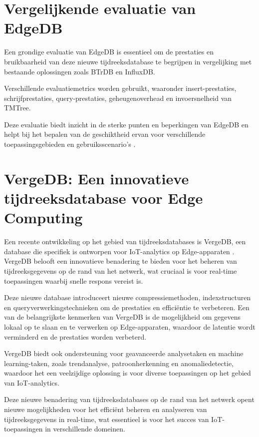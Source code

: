\section{Vergelijkende evaluatie van EdgeDB}

Een grondige evaluatie van EdgeDB is essentieel om de prestaties en bruikbaarheid van deze nieuwe tijdreeksdatabase te begrijpen in vergelijking met bestaande oplossingen zoals BTrDB en InfluxDB.

Verschillende evaluatiemetrics worden gebruikt, waaronder insert-prestaties, schrijfprestaties, query-prestaties, geheugenoverhead en invoersnelheid van TMTree.

Deze evaluatie biedt inzicht in de sterke punten en beperkingen van EdgeDB en helpt bij het bepalen van de geschiktheid ervan voor verschillende toepassingsgebieden en gebruiksscenario's \autocite{Yang2019EdgeDBAE}.

\section{VergeDB: Een innovatieve tijdreeksdatabase voor Edge Computing}

Een recente ontwikkeling op het gebied van tijdreeksdatabases is VergeDB, een database die specifiek is ontworpen voor IoT-analytics op Edge-apparaten \autocite{Paparrizos2021VergeDBAD}. VergeDB belooft een innovatieve benadering te bieden voor het beheren van tijdreeksgegevens op de rand van het netwerk, wat cruciaal is voor real-time toepassingen waarbij snelle respons vereist is.

Deze nieuwe database introduceert nieuwe compressiemethoden, indexstructuren en queryverwerkingstechnieken om de prestaties en efficiëntie te verbeteren. Een van de belangrijkste kenmerken van VergeDB is de mogelijkheid om gegevens lokaal op te slaan en te verwerken op Edge-apparaten, waardoor de latentie wordt verminderd en de prestaties worden verbeterd.

VergeDB biedt ook ondersteuning voor geavanceerde analysetaken en machine learning-taken, zoals trendanalyse, patroonherkenning en anomaliedetectie, waardoor het een veelzijdige oplossing is voor diverse toepassingen op het gebied van IoT-analytics.

Deze nieuwe benadering van tijdreeksdatabases op de rand van het netwerk opent nieuwe mogelijkheden voor het efficiënt beheren en analyseren van tijdreeksgegevens in real-time, wat essentieel is voor het succes van IoT-toepassingen in verschillende domeinen.

